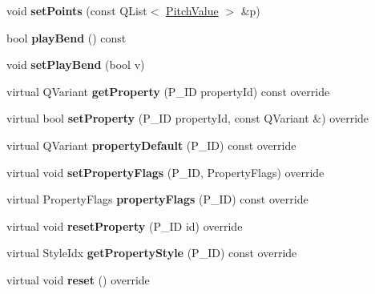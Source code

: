 \begin{DoxyCompactItemize}
\mbox{\label{class_ms_1_1_bend_aae9a8853f96ecdf25a0649c44e64842e}} 
void {\bfseries set\+Points} (const Q\+List$<$ \hyperlink{struct_ms_1_1_pitch_value}{Pitch\+Value} $>$ \&p)
\item 
\mbox{\label{class_ms_1_1_bend_ad418cde6c5e0f32164d4f80ae587b085}} 
bool {\bfseries play\+Bend} () const
\item 
\mbox{\label{class_ms_1_1_bend_a65f8234b37bd3f4aa0058a36a0a3c9cd}} 
void {\bfseries set\+Play\+Bend} (bool v)
\item 
\mbox{\label{class_ms_1_1_bend_a46e45ed76de707a46a559d75d2c971d5}} 
virtual Q\+Variant {\bfseries get\+Property} (P\+\_\+\+ID property\+Id) const override
\item 
\mbox{\label{class_ms_1_1_bend_aad6774881cb9ad377d6527a2b2d8d38e}} 
virtual bool {\bfseries set\+Property} (P\+\_\+\+ID property\+Id, const Q\+Variant \&) override
\item 
\mbox{\label{class_ms_1_1_bend_a88a8b055360f7251fa126f4a7cb918e2}} 
virtual Q\+Variant {\bfseries property\+Default} (P\+\_\+\+ID) const override
\item 
\mbox{\label{class_ms_1_1_bend_aa664a2bb48845d50c2e4a4230236c4b4}} 
virtual void {\bfseries set\+Property\+Flags} (P\+\_\+\+ID, Property\+Flags) override
\item 
\mbox{\label{class_ms_1_1_bend_acc6ffce1e12b30fadc9beff522a6aaca}} 
virtual Property\+Flags {\bfseries property\+Flags} (P\+\_\+\+ID) const override
\item 
\mbox{\label{class_ms_1_1_bend_aa7a330ebc814938ab7cb4c26b3b4fe71}} 
virtual void {\bfseries reset\+Property} (P\+\_\+\+ID id) override
\item 
\mbox{\label{class_ms_1_1_bend_ade5b94ad2bd069442888a073b02f2e80}} 
virtual Style\+Idx {\bfseries get\+Property\+Style} (P\+\_\+\+ID) const override
\item 
\mbox{\label{class_ms_1_1_bend_ad0d9c159fa93caef151806839590d0da}} 
virtual void {\bfseries reset} () override
\end{DoxyCompactItemize}
